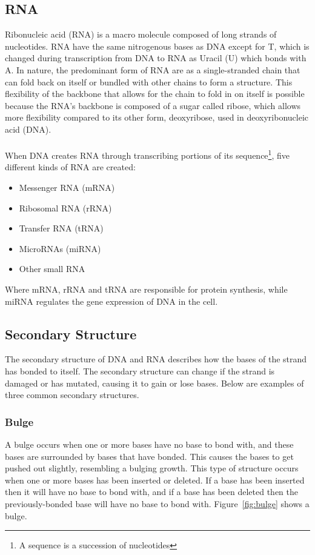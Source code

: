 \subsection{RNA}
Ribonucleic acid (RNA) is a macro molecule composed of long strands of 
nucleotides. RNA have the same nitrogenous bases as DNA except for T, which is 
changed during transcription from DNA to RNA as Uracil (U) which bonds with 
A. In nature, the predominant form of RNA are as a single-stranded chain that 
can fold back on itself or bundled with other chains to form a structure. This 
flexibility of the backbone that allows for the chain to fold in on itself is 
possible because the RNA's backbone is composed of a sugar called ribose, which 
allows more flexibility compared to its other form, deoxyribose, used in 
deoxyribonucleic acid (DNA).\\\\
When DNA creates RNA through transcribing portions of its sequence\footnote{A 
sequence is a succession of nucleotides}, five different kinds of RNA are 
created\cite[p. 236, table 7-1]{alberts}:
\begin{itemize}
\item Messenger RNA (mRNA)
\item Ribosomal RNA (rRNA)
\item Transfer RNA (tRNA)
\item MicroRNAs (miRNA)
\item Other small RNA
\end{itemize}
Where mRNA, rRNA and tRNA are responsible for protein synthesis, while miRNA 
regulates the gene expression of DNA in the cell.
\subsection{Secondary Structure}\label{structs}
The secondary structure of DNA and RNA describes how the bases of the 
strand has bonded to itself. The secondary structure can change if 
the strand is damaged or has mutated, causing it to gain or lose 
bases. Below are examples of three common secondary structures.
\subsubsection{Bulge}
A bulge occurs when one or more bases have no base to bond with, and these 
bases are surrounded by bases that have bonded. This causes the bases to get 
pushed out slightly, resembling a bulging growth. This type of structure occurs 
when one or more bases has been inserted or deleted. If a base has been 
inserted then it will have no base to bond with, and if a base has been deleted 
then the previously-bonded base will have no base to bond with. Figure~\ref{fig:bulge} shows a bulge.

